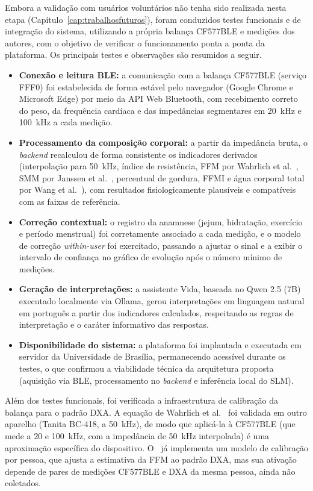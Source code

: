 Embora a validação com usuários voluntários não tenha sido realizada nesta etapa
(Capítulo~\ref{cap:trabalhosfuturos}), foram conduzidos testes funcionais e de integração do
sistema, utilizando a própria balança CF577BLE e medições dos autores, com o objetivo de
verificar o funcionamento ponta a ponta da plataforma. Os principais testes e observações
são resumidos a seguir.

\begin{itemize}
    \item \textbf{Conexão e leitura BLE:} a comunicação com a balança CF577BLE (serviço
    FFF0) foi estabelecida de forma estável pelo navegador (Google Chrome e Microsoft Edge)
    por meio da API Web Bluetooth, com recebimento correto do peso, da frequência cardíaca e
    das impedâncias segmentares em 20~kHz e 100~kHz a cada medição.
    \item \textbf{Processamento da composição corporal:} a partir da impedância bruta, o
    \emph{backend} recalculou de forma consistente os indicadores derivados (interpolação
    para 50~kHz, índice de resistência, FFM por Wahrlich et al.~\cite{wahrlich2026}, SMM por
    Janssen et al.~\cite{janssen2000}, percentual de gordura, FFMI e água corporal total por
    Wang et al.~\cite{wang1999}), com resultados fisiologicamente plausíveis e compatíveis
    com as faixas de referência.
    \item \textbf{Correção contextual:} o registro da anamnese (jejum, hidratação, exercício
    e período menstrual) foi corretamente associado a cada medição, e o modelo de correção
    \emph{within-user} foi exercitado, passando a ajustar o sinal e a exibir o intervalo de
    confiança no gráfico de evolução após o número mínimo de medições.
    \item \textbf{Geração de interpretações:} a assistente Vida, baseada no Qwen 2.5 (7B)
    executado localmente via Ollama, gerou interpretações em linguagem natural em português a
    partir dos indicadores calculados, respeitando as regras de interpretação e o caráter
    informativo das respostas.
    \item \textbf{Disponibilidade do sistema:} a plataforma foi implantada e executada em
    servidor da Universidade de Brasília, permanecendo acessível durante os testes, o que
    confirmou a viabilidade técnica da arquitetura proposta (aquisição via BLE, processamento
    no \emph{backend} e inferência local do SLM).
\end{itemize}

Além dos testes funcionais, foi verificada a infraestrutura de calibração da balança para o
padrão DXA. A equação de Wahrlich et al.~\cite{wahrlich2026} foi validada em outro aparelho
(Tanita BC-418, a 50~kHz), de modo que aplicá-la à CF577BLE (que mede a 20 e 100~kHz, com a
impedância de 50~kHz interpolada) é uma aproximação específica do dispositivo. O \sintonia\
já implementa um modelo de calibração por pessoa, que ajusta a estimativa da FFM ao padrão
DXA, mas sua ativação depende de pares de medições CF577BLE e DXA da mesma pessoa, ainda não
coletados.

